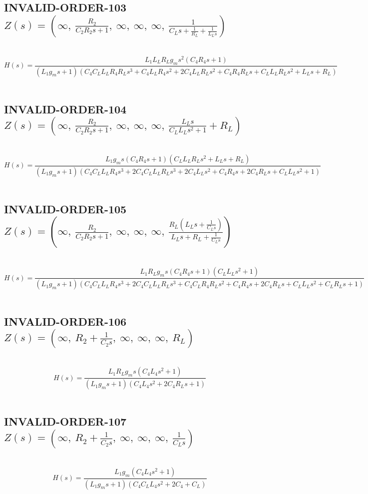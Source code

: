 \documentclass{article}
\begin{document}
\subsection{INVALID-ORDER-103 $Z(s) = \left( \infty, \  \frac{R_{2}}{C_{2} R_{2} s + 1}, \  \infty, \  \infty, \  \infty, \  \frac{1}{C_{L} s + \frac{1}{R_{L}} + \frac{1}{L_{L} s}}\right)$ } \ 
\textbf{\[H(s) = \frac{L_{1} L_{L} R_{L} g_{m} s^{2} \left(C_{4} R_{4} s + 1\right)}{\left(L_{1} g_{m} s + 1\right) \left(C_{4} C_{L} L_{L} R_{4} R_{L} s^{3} + C_{4} L_{L} R_{4} s^{2} + 2 C_{4} L_{L} R_{L} s^{2} + C_{4} R_{4} R_{L} s + C_{L} L_{L} R_{L} s^{2} + L_{L} s + R_{L}\right)}\] } \ 
\subsection{INVALID-ORDER-104 $Z(s) = \left( \infty, \  \frac{R_{2}}{C_{2} R_{2} s + 1}, \  \infty, \  \infty, \  \infty, \  \frac{L_{L} s}{C_{L} L_{L} s^{2} + 1} + R_{L}\right)$ } \ 
\textbf{\[H(s) = \frac{L_{1} g_{m} s \left(C_{4} R_{4} s + 1\right) \left(C_{L} L_{L} R_{L} s^{2} + L_{L} s + R_{L}\right)}{\left(L_{1} g_{m} s + 1\right) \left(C_{4} C_{L} L_{L} R_{4} s^{3} + 2 C_{4} C_{L} L_{L} R_{L} s^{3} + 2 C_{4} L_{L} s^{2} + C_{4} R_{4} s + 2 C_{4} R_{L} s + C_{L} L_{L} s^{2} + 1\right)}\] } \ 
\subsection{INVALID-ORDER-105 $Z(s) = \left( \infty, \  \frac{R_{2}}{C_{2} R_{2} s + 1}, \  \infty, \  \infty, \  \infty, \  \frac{R_{L} \left(L_{L} s + \frac{1}{C_{L} s}\right)}{L_{L} s + R_{L} + \frac{1}{C_{L} s}}\right)$ } \ 
\textbf{\[H(s) = \frac{L_{1} R_{L} g_{m} s \left(C_{4} R_{4} s + 1\right) \left(C_{L} L_{L} s^{2} + 1\right)}{\left(L_{1} g_{m} s + 1\right) \left(C_{4} C_{L} L_{L} R_{4} s^{3} + 2 C_{4} C_{L} L_{L} R_{L} s^{3} + C_{4} C_{L} R_{4} R_{L} s^{2} + C_{4} R_{4} s + 2 C_{4} R_{L} s + C_{L} L_{L} s^{2} + C_{L} R_{L} s + 1\right)}\] } \ 
\subsection{INVALID-ORDER-106 $Z(s) = \left( \infty, \  R_{2} + \frac{1}{C_{2} s}, \  \infty, \  \infty, \  \infty, \  R_{L}\right)$ } \ 
\textbf{\[H(s) = \frac{L_{1} R_{L} g_{m} s \left(C_{4} L_{4} s^{2} + 1\right)}{\left(L_{1} g_{m} s + 1\right) \left(C_{4} L_{4} s^{2} + 2 C_{4} R_{L} s + 1\right)}\] } \ 
\subsection{INVALID-ORDER-107 $Z(s) = \left( \infty, \  R_{2} + \frac{1}{C_{2} s}, \  \infty, \  \infty, \  \infty, \  \frac{1}{C_{L} s}\right)$ } \ 
\textbf{\[H(s) = \frac{L_{1} g_{m} \left(C_{4} L_{4} s^{2} + 1\right)}{\left(L_{1} g_{m} s + 1\right) \left(C_{4} C_{L} L_{4} s^{2} + 2 C_{4} + C_{L}\right)}\] } \ 
\end{document}
